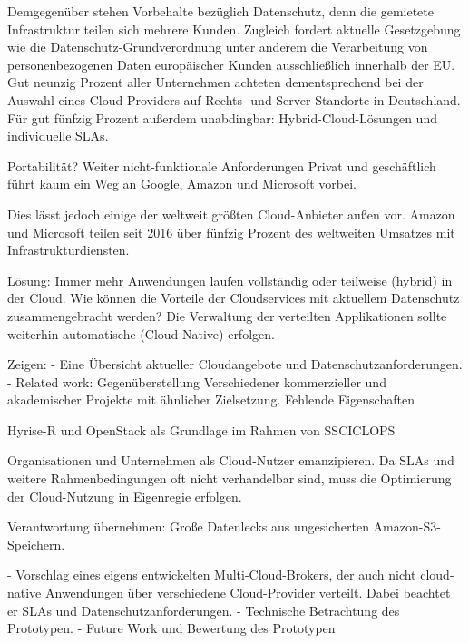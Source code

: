 Demgegenüber stehen Vorbehalte bezüglich Datenschutz, denn die gemietete Infrastruktur teilen sich mehrere Kunden. Zugleich fordert aktuelle Gesetzgebung wie die Datenschutz-Grundverordnung unter anderem die Verarbeitung von personenbezogenen Daten europäischer Kunden ausschließlich innerhalb der EU. %
Gut neunzig Prozent aller Unternehmen achteten dementsprechend bei der Auswahl eines Cloud-Providers auf Rechts- und Server-Standorte in Deutschland. Für gut fünfzig Prozent außerdem unabdingbar: Hybrid-Cloud-Lösungen und individuelle SLAs.

Portabilität? Weiter nicht-funktionale Anforderungen
Privat und geschäftlich führt kaum ein Weg an Google, Amazon und Microsoft vorbei. 


Dies lässt jedoch einige der weltweit größten Cloud-Anbieter außen vor. Amazon und Microsoft teilen seit 2016 über fünfzig Prozent des weltweiten Umsatzes mit Infrastrukturdiensten. %

Lösung: Immer mehr Anwendungen laufen vollständig oder teilweise (hybrid) in der Cloud. Wie können die Vorteile der Cloudservices mit aktuellem Datenschutz zusammengebracht werden? Die Verwaltung der verteilten Applikationen sollte weiterhin automatische (Cloud Native) erfolgen.

Zeigen: 
- Eine Übersicht aktueller Cloudangebote und Datenschutzanforderungen.
- Related work: Gegenüberstellung Verschiedener kommerzieller und akademischer Projekte mit ähnlicher Zielsetzung. Fehlende Eigenschaften

Hyrise-R und OpenStack als Grundlage im Rahmen von SSCICLOPS

Organisationen und Unternehmen als Cloud-Nutzer emanzipieren. Da SLAs und weitere Rahmenbedingungen oft nicht verhandelbar sind, muss die Optimierung der Cloud-Nutzung in Eigenregie erfolgen.

Verantwortung übernehmen: Große Datenlecks aus ungesicherten Amazon-S3-Speichern.

- Vorschlag eines eigens entwickelten Multi-Cloud-Brokers, der auch nicht cloud-native Anwendungen über verschiedene Cloud-Provider verteilt. Dabei beachtet er SLAs und Datenschutzanforderungen.
- Technische Betrachtung des Prototypen.
- Future Work und Bewertung des Prototypen